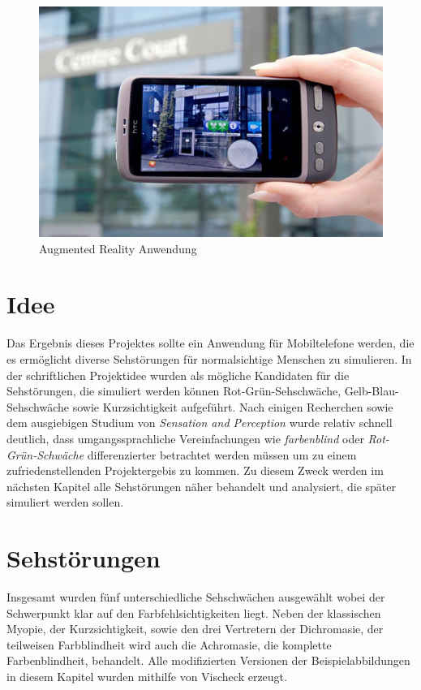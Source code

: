 \documentclass[a4paper]{article}
\begin{document}
\begin{figure}[H]
\centering
\includegraphics[width=\textwidth, trim=0 50 0 60, clip=true]{augmented-reality.jpg}
\caption{Augmented Reality Anwendung}
\label{augmented-reality}
\end{figure}

\newpage

\section*{Idee}
Das Ergebnis dieses Projektes sollte ein Anwendung für Mobiltelefone werden, die es ermöglicht diverse Sehstörungen für normalsichtige Menschen zu simulieren. In der schriftlichen Projektidee wurden als mögliche Kandidaten für die Sehstörungen, die simuliert werden können Rot-Grün-Sehschwäche, Gelb-Blau-Sehschwäche sowie Kurzsichtigkeit aufgeführt. Nach einigen Recherchen sowie dem ausgiebigen Studium von \textit{Sensation and Perception} \cite{Goldstein2009} wurde relativ schnell deutlich, dass umgangssprachliche Vereinfachungen wie \textit{farbenblind} oder \textit{Rot-Grün-Schwäche} differenzierter betrachtet werden müssen um zu einem zufriedenstellenden Projektergebis zu kommen. Zu diesem Zweck werden im nächsten Kapitel alle Sehstörungen näher behandelt und analysiert, die später simuliert werden sollen.

\section*{Sehstörungen}
Insgesamt wurden fünf unterschiedliche Sehschwächen ausgewählt wobei der Schwerpunkt klar auf den Farbfehlsichtigkeiten liegt. Neben der klassischen Myopie, der Kurzsichtigkeit, sowie den drei Vertretern der Dichromasie, der teilweisen Farbblindheit \cite{WP-D} wird auch die Achromasie, die komplette Farbenblindheit, behandelt. Alle modifizierten Versionen der Beispielabbildungen in diesem Kapitel wurden mithilfe von Vischeck \cite{VISCHECK} erzeugt.
\end{document}

